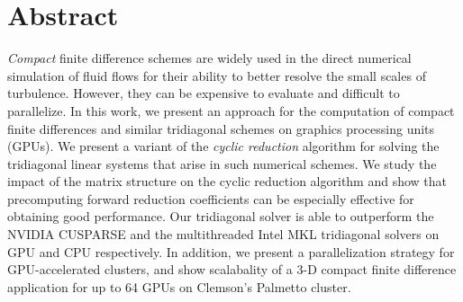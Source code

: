 \chapter*{Abstract}

\emph{Compact} finite difference schemes are widely used
in the direct numerical simulation of fluid flows
for their ability to better resolve the small scales of turbulence.
However, they can be expensive to evaluate and
difficult to parallelize.
In this work, we present an approach for the computation
of compact finite differences
and similar tridiagonal schemes
on graphics processing units (GPUs).
We present a variant of the \emph{cyclic reduction} 
algorithm for solving the
tridiagonal linear systems that arise in such numerical schemes.
We study the impact of the matrix structure on
the cyclic reduction algorithm
and show that precomputing
forward reduction coefficients can be
especially effective for obtaining good performance.
Our tridiagonal solver is able to outperform
the NVIDIA CUSPARSE
and the multithreaded Intel MKL tridiagonal solvers
on GPU and CPU respectively.
In addition,
we present a parallelization strategy for GPU-accelerated clusters,
and show scalabality
of a 3-D compact finite difference application
for up to 64 GPUs on Clemson's Palmetto cluster.
